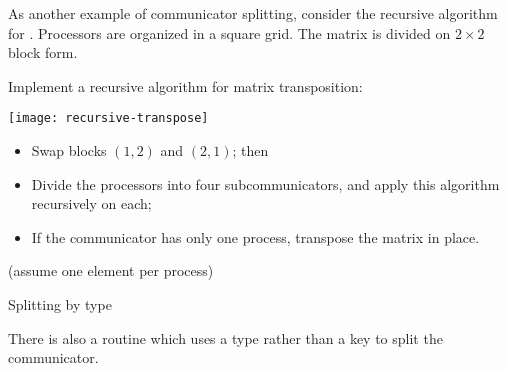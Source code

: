 As another example of communicator splitting, consider the recursive
algorithm for .
%
%
Processors are organized in a square grid. The matrix is divided
on $2\times 2$ block form.

\begin{exercise}
  \label{ex:recursivetranspose}
  Implement a recursive algorithm for matrix transposition:
  
  \texttt{[image: recursive-transpose]}

  \begin{itemize}
  \item Swap blocks $(1,2)$ and $(2,1)$; then
  \item Divide the processors into four subcommunicators, and
    apply this algorithm recursively on each;
  \item If the communicator has only one process, transpose the matrix in place.
  \end{itemize}
  (assume one element per process)
\end{exercise}

 {Splitting by type}
\label{mpi-comm-split-type}

There is also a routine 
which uses a type rather than a key to split the communicator.

